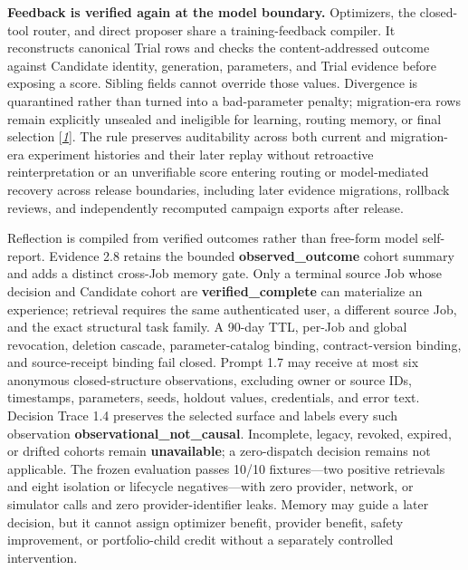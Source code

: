 \textbf{Feedback is verified again at the model boundary.} Optimizers,
the closed-tool router, and direct proposer share a training-feedback
compiler. It reconstructs canonical Trial rows and checks the
content-addressed outcome against Candidate identity, generation,
parameters, and Trial evidence before exposing a score. Sibling fields
cannot override those values. Divergence is quarantined rather than
turned into a bad-parameter penalty; migration-era rows remain
explicitly
unsealed and ineligible for learning, routing memory, or final selection
{[}\protect\hyperlink{ref_1}{\emph{1}}{]}. The rule preserves
auditability across both current and migration-era experiment histories
and their later replay without retroactive reinterpretation or an
unverifiable score entering routing or model-mediated recovery across
release boundaries, including later evidence migrations, rollback reviews,
and independently recomputed campaign exports after release.

Reflection is compiled from verified outcomes rather than free-form
model self-report. Evidence 2.8 retains the bounded
\textbf{observed\_outcome} cohort summary and adds a distinct cross-Job
memory gate. Only a terminal source Job whose decision and Candidate
cohort are \textbf{verified\_complete} can materialize an experience;
retrieval requires the same authenticated user, a different source Job,
and the exact structural task family. A 90-day TTL, per-Job and global
revocation, deletion cascade, parameter-catalog binding, contract-version
binding, and source-receipt binding fail closed. Prompt 1.7 may receive at
most six anonymous closed-structure observations, excluding owner or
source IDs, timestamps, parameters, seeds, holdout values, credentials,
and error text. Decision Trace 1.4 preserves the selected surface and
labels every such observation \textbf{observational\_not\_causal}.
Incomplete, legacy, revoked, expired, or drifted cohorts remain
\textbf{unavailable}; a zero-dispatch decision remains not applicable.
The frozen evaluation passes 10/10 fixtures---two positive retrievals and
eight isolation or lifecycle negatives---with zero provider, network, or
simulator calls and zero provider-identifier leaks.
Memory may guide a later decision, but it cannot assign optimizer benefit,
provider benefit, safety improvement, or portfolio-child credit without a
separately controlled intervention.

